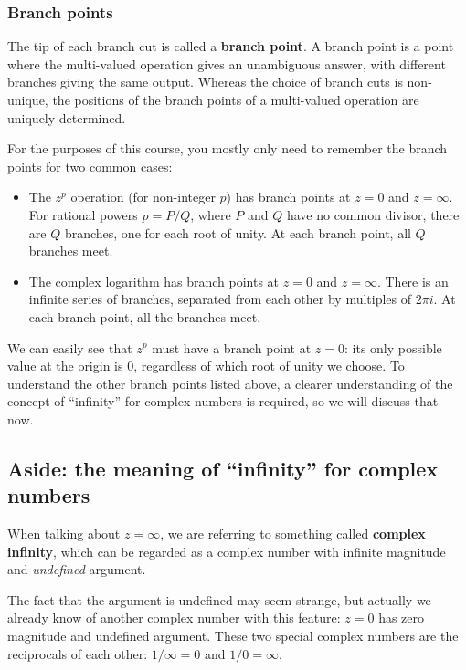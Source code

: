 \documentclass[10pt,a4paper]{article}
\begin{document}
\subsubsection{Branch points}
\label{branch-points}

The tip of each branch cut is called a \textbf{branch point}. A branch
point is a point where the multi-valued operation gives an unambiguous
answer, with different branches giving the same output. Whereas the
choice of branch cuts is non-unique, the positions of the branch points
of a multi-valued operation are uniquely determined.

For the purposes of this course, you mostly only need to remember the
branch points for two common cases:

\begin{itemize}
\item
  The $z^p$ operation (for non-integer $p$) has branch points at $z =
  0$ and $z = \infty$. For rational powers $p = P/Q$, where $P$ and
  $Q$ have no common divisor, there are $Q$ branches, one for each
  root of unity. At each branch point, all $Q$ branches meet.
\item
  The complex logarithm has branch points at $z = 0$ and $z =
  \infty$. There is an infinite series of branches, separated from
  each other by multiples of $2 \pi i$. At each branch point, all the
  branches meet.
\end{itemize}

\noindent
We can easily see that $z^p$ must have a branch point at $z = 0$: its
only possible value at the origin is $0$, regardless of which root of
unity we choose. To understand the other branch points listed above, a
clearer understanding of the concept of ``infinity'' for complex
numbers is required, so we will discuss that now.

\subsection{Aside: the meaning of ``infinity'' for complex numbers}
\label{aside-the-meaning-of-infinity-for-complex-numbers}

When talking about $z = \infty$, we are referring to something called
\textbf{complex infinity}, which can be regarded as a complex number
with infinite magnitude and \emph{undefined} argument.

The fact that the argument is undefined may seem strange, but actually
we already know of another complex number with this feature: $z = 0$
has zero magnitude and undefined argument.  These two special complex
numbers are the reciprocals of each other: $1/\infty = 0$ and $1/0 =
\infty$.
\end{document}
